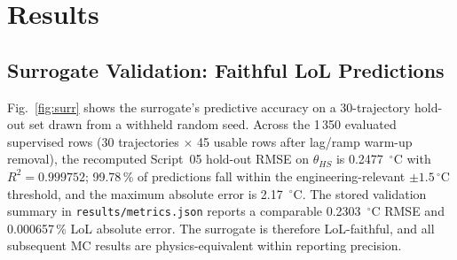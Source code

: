 \documentclass[conference]{IEEEtran}
\begin{document}
\begin{table}[!t]
\renewcommand{\arraystretch}{1.15}
\caption{Selected scenarios used for headline LoL figures.}
\label{tab:scenarios}
\centering
{}
\end{table}

\section{Results}
\label{sec:results}

\subsection{Surrogate Validation: Faithful LoL Predictions}
\label{sec:res-surr}
Fig.~\ref{fig:surr} shows the surrogate's predictive accuracy on a 30-trajectory hold-out set drawn from a withheld random seed. Across the 1\,350 evaluated supervised rows (30 trajectories $\times$ 45 usable rows after lag/ramp warm-up removal), the recomputed Script~05 hold-out RMSE on $\theta_{HS}$ is 0.2477~$^\circ$C with $R^2 = 0.999752$; 99.78\,\% of predictions fall within the engineering-relevant $\pm 1.5\,^\circ$C threshold, and the maximum absolute error is 2.17~$^\circ$C. The stored validation summary in \texttt{results/metrics.json} reports a comparable 0.2303~$^\circ$C RMSE and 0.000657\,\% LoL absolute error. The surrogate is therefore LoL-faithful, and all subsequent MC results are physics-equivalent within reporting precision.
\end{document}
